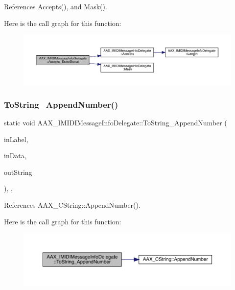 References Accepts(), and Mask().

Here is the call graph for this function\+:
\nopagebreak
\begin{figure}[H]
\begin{center}
\leavevmode
\includegraphics[width=350pt]{a01953_a309f83a83541ce2b1f429ae2d009616c_cgraph}
\end{center}
\end{figure}
\mbox{\label{a01953_a0ed17623300136c5723cd3ea36804fd0}} 
\subsubsection{\texorpdfstring{ToString\_AppendNumber()}{ToString\_AppendNumber()}}
{\footnotesize\ttfamily static void A\+A\+X\+\_\+\+I\+M\+I\+D\+I\+Message\+Info\+Delegate\+::\+To\+String\+\_\+\+Append\+Number (\begin{DoxyParamCaption}\item[{const char $\ast$}]{in\+Label,  }\item[{int32\+\_\+t}]{in\+Data,  }\item[{\mbox{\hyperlink{a01573}{A\+A\+X\+\_\+\+C\+String}} \&}]{out\+String }\end{DoxyParamCaption})\hspace{0.3cm}{\ttfamily [inline]}, {\ttfamily [static]}, {\ttfamily [protected]}}



References A\+A\+X\+\_\+\+C\+String\+::\+Append\+Number().

Here is the call graph for this function\+:
\nopagebreak
\begin{figure}[H]
\begin{center}
\leavevmode
\includegraphics[width=350pt]{a01953_a0ed17623300136c5723cd3ea36804fd0_cgraph}
\end{center}
\end{figure}
\mbox{\label{a01953_a020ec843c8ec267a5afa66415c3df95a}} 
